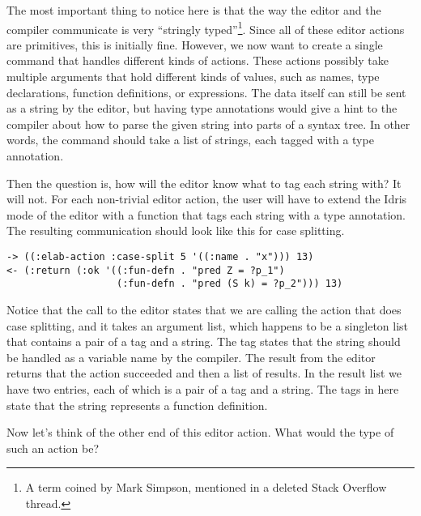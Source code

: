 The most important thing to notice here is that the way the editor and the
compiler communicate is very ``stringly typed''\footnote{A term coined by Mark
Simpson, mentioned in a deleted Stack Overflow thread.}.  Since all of these
editor actions are primitives, this is initially fine. However, we now want to
create a single command that handles different kinds of actions. These actions
possibly take multiple arguments that hold different kinds of values, such as
names, type declarations, function definitions, or expressions.
The data itself can still be sent as a string by the editor, but having type
annotations would give a hint to the compiler about how to parse the given
string into parts of a syntax tree. In other words, the command should take a
list of strings, each tagged with a type annotation.

Then the question is, how will the editor know what to tag each string with?
It will not. For each non-trivial editor action, the user will have to extend
the Idris mode of the editor with a function that tags each string with a type
annotation. The resulting communication should look like this for case splitting.

\begin{Verbatim}
-> ((:elab-action :case-split 5 '((:name . "x"))) 13)
<- (:return (:ok '((:fun-defn . "pred Z = ?p_1")
                   (:fun-defn . "pred (S k) = ?p_2"))) 13)
\end{Verbatim}

Notice that the call to the editor states that we are calling the \Elab
action that does case splitting, and it takes an argument list, which happens
to be a singleton list that contains a pair of a tag and a string. The tag
states that the string should be handled as a variable name by the compiler.
The result from the editor returns that the action succeeded and then a list of
results.  In the result list we have two entries, each of which is a pair of a
tag and a string.  The tags in here state that the string represents a function
definition.

Now let's think of the other end of this editor action. What would the type of
such an \Elab action be?

